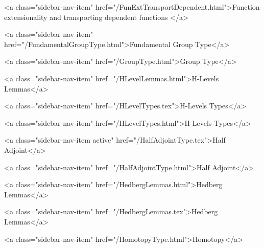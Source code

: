       
    
      
        
          <a class="sidebar-nav-item" href="/FunExtTransportDependent.html">Function extensionality and transporting dependent functions </a>
        
      
    
      
        
          <a class="sidebar-nav-item" href="/FundamentalGroupType.html">Fundamental Group Type</a>
        
      
    
      
        
          <a class="sidebar-nav-item" href="/GroupType.html">Group Type</a>
        
      
    
      
        
          <a class="sidebar-nav-item" href="/HLevelLemmas.html">H-Levels Lemmas</a>
        
      
    
      
        
          <a class="sidebar-nav-item" href="/HLevelTypes.tex">H-Levels Types</a>
        
      
    
      
        
          <a class="sidebar-nav-item" href="/HLevelTypes.html">H-Levels Types</a>
        
      
    
      
        
          <a class="sidebar-nav-item active" href="/HalfAdjointType.tex">Half Adjoint</a>
        
      
    
      
        
          <a class="sidebar-nav-item" href="/HalfAdjointType.html">Half Adjoint</a>
        
      
    
      
        
          <a class="sidebar-nav-item" href="/HedbergLemmas.html">Hedberg Lemmas</a>
        
      
    
      
        
          <a class="sidebar-nav-item" href="/HedbergLemmas.tex">Hedberg Lemmas</a>
        
      
    
      
        
          <a class="sidebar-nav-item" href="/HomotopyType.html">Homotopy</a>
        
